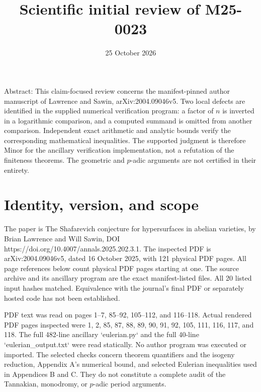 \documentclass[10pt]{article}
\title{Scientific initial review of M25-0023}
\author{}
\date{25 October 2026}
\begin{document}
\maketitle
Abstract: This claim-focused review concerns the manifest-pinned author manuscript of Lawrence and Sawin, arXiv:2004.09046v5. Two local defects are identified in the supplied numerical verification program: a factor of \(n\) is inverted in a logarithmic comparison, and a computed summand is omitted from another comparison. Independent exact arithmetic and analytic bounds verify the corresponding mathematical inequalities. The supported judgment is therefore Minor for the ancillary verification implementation, not a refutation of the finiteness theorems. The geometric and \(p\)-adic arguments are not certified in their entirety.\par
\section*{Identity, version, and scope}
The paper is The Shafarevich conjecture for hypersurfaces in abelian varieties, by Brian Lawrence and Will Sawin, DOI https://doi.org/10.4007/annals.2025.202.3.1. The inspected PDF is arXiv:2004.09046v5, dated 16 October 2025, with 121 physical PDF pages. All page references below count physical PDF pages starting at one. The source archive and its ancillary program are the exact manifest-listed files. All 20 listed input hashes matched. Equivalence with the journal’s final PDF or separately hosted code has not been established.\par
PDF text was read on pages 1–7, 85–92, 105–112, and 116–118. Actual rendered PDF pages inspected were 1, 2, 85, 87, 88, 89, 90, 91, 92, 105, 111, 116, 117, and 118. The full 482-line ancillary `eulerian.py` and the full 40-line `eulerian\_output.txt` were read statically. No author program was executed or imported. The selected checks concern theorem quantifiers and the isogeny reduction, Appendix A’s numerical bound, and selected Eulerian inequalities used in Appendices B and C. They do not constitute a complete audit of the Tannakian, monodromy, or \(p\)-adic period arguments.\par
\end{document}
